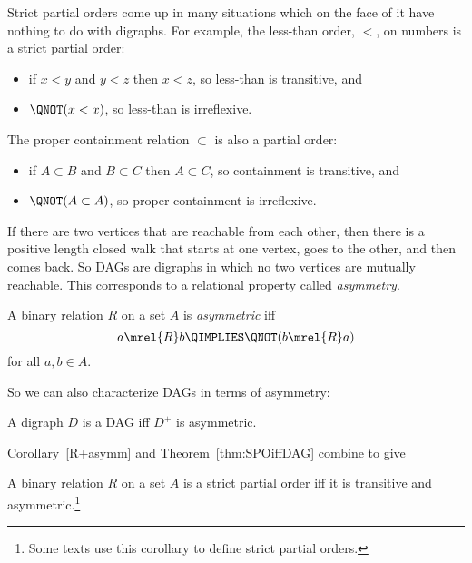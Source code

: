 Strict partial orders come up in many situations which on the face of
it have nothing to do with digraphs.  For example, the less-than
order, $<$, on numbers is a strict partial order:
\begin{itemize}
\item if $x <y$ and $y < z$ then $x < z$, so less-than is transitive, and
\item  $\QNOT(x < x)$, so less-than is irreflexive.
\end{itemize}
The proper containment relation $\subset$ is also a
partial order:
\begin{itemize}
\item if $A \subset B$ and $B \subset C$ then $A \subset C$,
so containment is transitive, and
\item  $\QNOT(A \subset A)$, so proper containment is irreflexive.
\end{itemize}

If there are two vertices that are reachable from each other, then
there is a positive length closed walk that starts at one vertex, goes
to the other, and then comes back.  So DAGs are digraphs in which no
two vertices are mutually reachable.  This corresponds to a relational
property called \emph{asymmetry}.

\begin{definition}
A binary relation $R$ on a set $A$ is \emph{asymmetric}%
iff
\[
a \mrel{R} b \QIMPLIES \QNOT(b \mrel{R} a)
\]
for all $a,b \in A$.
\end{definition}
So we can also characterize DAGs in terms of asymmetry:
\begin{corollary}\label{R+asymm}
A digraph $D$ is a DAG iff $D^+$ is asymmetric.
\end{corollary}

Corollary~\ref{R+asymm} and Theorem~\ref{thm:SPOiffDAG} combine to give
\begin{corollary}\label{cor:spoifftransasym}
A binary relation $R$ on a set $A$ is a strict partial order iff it is
transitive and asymmetric.\footnote{Some texts use this corollary to
  define strict partial orders.}
\end{corollary}

\iffalse
can be an economical way to represent partial orders.  For example,
the \emph{direct prerequisite} relation between MIT subjects in
Chapter~\ref{partial-order-chapter} was used to determine the partial
order of indirect prerequisites on subjects.  This indirect
prerequisite partial order is precisely the positive length walk
relation of the direct prerequisites.
\fi

